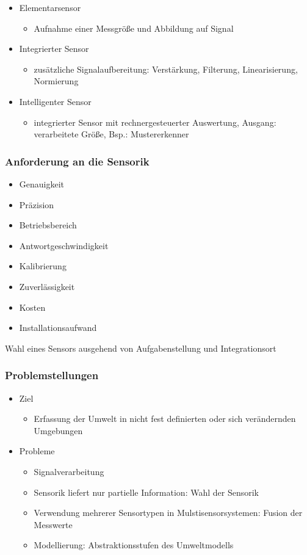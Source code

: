 \documentclass[paper=a4, fontsize=11pt]{scrartcl} %
\numberwithin{equation}{section} %
\numberwithin{figure}{section} %
\numberwithin{table}{section} %
\begin{document}
\begin{itemize}
\item Elementarsensor
\begin{itemize}
\item Aufnahme einer Messgröße und Abbildung auf Signal
\end{itemize}
\item Integrierter Sensor
\begin{itemize}
\item zusätzliche Signalaufbereitung: Verstärkung, Filterung, Linearisierung, Normierung
\end{itemize}
\item Intelligenter Sensor
\begin{itemize}
\item integrierter Sensor mit rechnergesteuerter Auswertung, Ausgang: verarbeitete Größe, Bsp.: Mustererkenner
\end{itemize}
\end{itemize}

\subsubsection{Anforderung an die Sensorik}

\begin{itemize}
\item Genauigkeit
\item Präzision
\item Betriebsbereich
\item Antwortgeschwindigkeit
\item Kalibrierung
\item Zuverlässigkeit
\item Kosten
\item Installationsaufwand
\end{itemize}

Wahl eines Sensors ausgehend von Aufgabenstellung und Integrationsort

\subsubsection{Problemstellungen}

\begin{itemize}
\item Ziel
\begin{itemize}
\item Erfassung der Umwelt in nicht fest definierten oder sich verändernden Umgebungen
\end{itemize}
\item Probleme
\begin{itemize}
\item Signalverarbeitung
\item Sensorik liefert nur partielle Information: Wahl der Sensorik
\item Verwendung mehrerer Sensortypen in Mulstisensorsystemen: Fusion der Messwerte
\item Modellierung: Abstraktionsstufen des Umweltmodells
\end{itemize}
\end{itemize}
\end{document}
